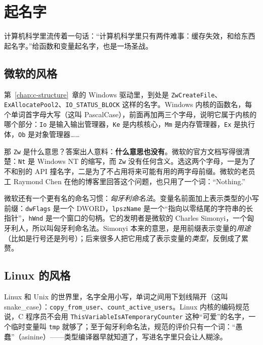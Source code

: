 \section{起名字}

计算机科学里流传着一句话：“计算机科学里只有两件难事：缓存失效，和给东西起名字。”给函数和变量起名字，也是一场圣战。

\subsection{微软的风格}

第~\ref{chap:c-structure}~章的 Windows 驱动里，到处是 \texttt{ZwCreateFile}、\texttt{ExAllocatePool2}、\texttt{IO\_STATUS\_BLOCK} 这样的名字。Windows 内核的函数名，每个单词首字母大写（这叫 PascalCase），前面再加两三个字母，说明它属于内核的哪个部分：\texttt{Io} 是输入输出管理器，\texttt{Ke} 是内核核心，\texttt{Mm} 是内存管理器，\texttt{Ex} 是执行体，\texttt{Ob} 是对象管理器……

那 \texttt{Zw} 是什么意思？答案出人意料：\textbf{什么意思也没有}。微软的官方文档写得很清楚：\texttt{Nt} 是 Windows NT 的缩写，而 \texttt{Zw} 没有任何含义。选这两个字母，一是为了不和别的 API 撞名字，二是为了不占用将来可能有用的两字母前缀。微软的老员工 Raymond Chen 在他的博客里回答这个问题，也只用了一个词：“Nothing.”

微软还有一个更有名的命名习惯：\emph{匈牙利命名法}。变量名前面加上表示类型的小写前缀：\texttt{dwFlags} 是一个 DWORD，\texttt{lpszName} 是一个“指向以零结尾的字符串的长指针”，\texttt{hWnd} 是一个窗口的句柄。它的发明者是微软的 Charles Simonyi，一个匈牙利人，所以叫匈牙利命名法。Simonyi 本来的意思，是用前缀表示变量的\emph{用途}（比如是行号还是列号）；后来很多人把它用成了表示变量的\emph{类型}，反倒成了累赘。

\subsection{Linux 的风格}

Linux 和 Unix 的世界里，名字全用小写，单词之间用下划线隔开（这叫 snake\_case）：\texttt{copy\_from\_user}、\texttt{count\_active\_users}。Linux 内核的编码规范说，C 程序员不会用 \texttt{This\-Variable\-Is\-A\-Temporary\-Counter} 这种“可爱”的名字，一个临时变量叫 \texttt{tmp} 就够了；至于匈牙利命名法，规范的评价只有一个词：“愚蠢”（asinine）——类型编译器早就知道了，写进名字里只会让人糊涂。


